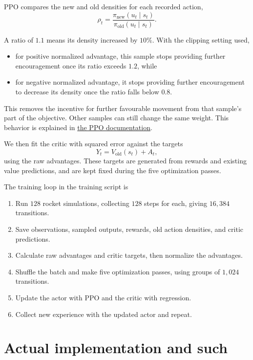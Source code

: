 \documentclass[12pt, letterpaper]{article}
\begin{document}
PPO compares the new and old densities for each recorded 
action, 
\[
    \rho_t = \frac{\pi_{\text{new}}(u_t\mid s_t)}{\pi_{\text{old}}(u_t\mid s_t)}. 
\]

A ratio of $1.1$ means its density increased by $10\%$. 
With the clipping setting used, 
\begin{itemize}
    \item for positive normalized advantage, this sample 
    stops providing further encouragement once its ratio exceeds 
    $1.2$, while  
    \item for negative normalized advantage, it stops providing further 
    encouragement to decrease its 
    density once the ratio falls below $0.8$.
\end{itemize}
This removes the incentive for further 
favourable movement from that 
sample's part of the objective. 
Other samples can still change the same weight. 
This behavior is explained in 
\href{https://spinningup.openai.com/en/latest/algorithms/ppo.html}{the PPO documentation}. 

We then fit the critic with squared error against the targets
\[
    Y_t = V_{\mathrm{old}}(s_t) + A_t,
\]
using the raw advantages. These targets are generated from rewards
and existing value predictions, and are kept fixed during the five
optimization passes.

The training loop in the training 
script is 
\begin{enumerate}
    \item Run $128$ rocket simulations, collecting 
    $128$ steps for each, giving $16,384$ transitions. 
    \item Save observations, sampled outputs, rewards, 
    old action densities, and critic predictions. 
    \item Calculate raw advantages 
    and critic targets, then normalize the 
    advantages. 
    \item Shuffle the batch and make five optimization 
    passes, using groups of $1,024$ transitions. 
    \item Update the actor with PPO and the critic 
    with regression. 
    \item Collect new experience with the updated 
    actor and repeat. 
\end{enumerate}

\section{Actual implementation and such}
\end{document}
